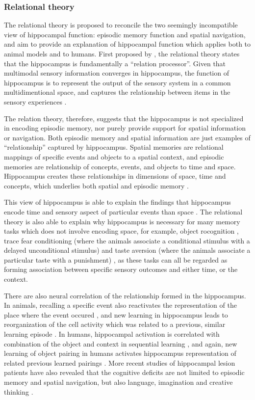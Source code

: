 \subsubsection{Relational theory}

The relational theory is proposed to reconcile the two seemingly incompatible view of hippocampal function: episodic memory function and spatial navigation, and aim to provide an explanation of hippocampal function which applies both to animal models and to humans. First proposed by \citet{eichenbaum93}, the relational theory states that the hippocampus is fundamentally a ``relation processor''. Given that multimodal sensory information converges in hippocampus, the function of hippocampus is to represent the output of the sensory system in a common multidimentional space, and captures the relationship between items in the sensory experiences \citep{eichenbaum93}.

The relation theory, therefore, suggests that the hippocampus is not specialized in encoding episodic memory, nor purely provide support for spatial information or navigation. Both episodic memory and spatial information are just examples of ``relationship'' captured by hippocampus. Spatial memories are relational mappings of specific events and objects to a spatial context, and episodic memories are relationship of concepts, events, and objects to time and space. Hippocampus creates these relationships in dimensions of space, time and concepts, which underlies both spatial and episodic memory \citep{
eichenbaum14}.

This view of hippocampus is able to explain the findings that hippocampus encode time and sensory aspect of particular events than space \citep{hampson93, young94, wood99, moser08}. The relational theory is also able to explain why hippocampus is necessary for many memory tasks which does not involve encoding space, for example, object rocognition \citep{eacott04, langston10}, trace fear conditioning (where the animals associate a conditional stimulus with a delayed unconditional stimulus) \citep{crestani02, mcechron98} and taste aversion (where the animals associate a particular taste with a punishment) \citep{best73, gallo95}, as these tasks can all be regarded as forming association between specific sensory outcomes and either time, or the context. 

There are also neural correlation of the relationship formed in the hippocampus. In animals, recalling a specific event also reactivates the representation of the place where the event occured \citep{moita03, itskov11}, and new learning in hippocampus leads to reorganization of the cell activity which was related to a previous, similar learning episode \citep{mckenzie13}. In humans, hippocampal activation is correlated with combination of the object and context in sequential learning \citep{hsieh14}, and again, new learning of object pairing in humans activates hippocampus representation of related previous learned pairings \citep{zeithamova12}. More recent studies of hippocampal lesion patients have also revealed that the cognitive deficits are not limited to episodic memory and spatial navigation, but also language, imagination and creative thinking \citep{duff09, duff13}.


